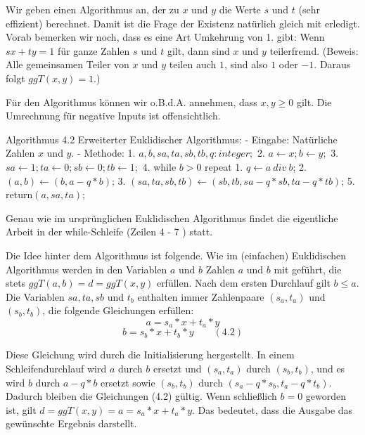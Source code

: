 \documentclass[a4paper]{article}
\begin{document}
\begin{multicols}{3}
        Wir geben einen Algorithmus an, der zu $x$ und $y$ die Werte $s$ und $t$ (sehr effizient) berechnet. Damit ist die Frage der Existenz natürlich gleich mit erledigt. Vorab bemerken wir noch, dass es eine Art Umkehrung von 1. gibt: Wenn $sx+ty= 1$ für ganze Zahlen $s$ und $t$ gilt, dann sind $x$ und $y$ teilerfremd. (Beweis: Alle gemeinsamen Teiler von $x$ und $y$ teilen auch $1$, sind also $1$ oder $-1$. Daraus folgt $ggT(x,y) = 1$.)

        Für den Algorithmus können wir o.B.d.A. annehmen, dass $x,y\geq 0$ gilt. Die Umrechnung für negative Inputs ist offensichtlich.

        Algorithmus 4.2 Erweiterter Euklidischer Algorithmus:
        - Eingabe: Natürliche Zahlen $x$ und $y$.
        - Methode:
        1. $a,b,sa,ta,sb,tb,q:integer;$
        2. $a\leftarrow x; b\leftarrow y;$
        3. $sa\leftarrow 1; ta\leftarrow 0; sb\leftarrow 0; tb\leftarrow 1;$
        4. while $b> 0$ repeat
        1. $q\leftarrow a\ div\ b$;
        2. $(a,b)\leftarrow (b,a-q*b)$;
        3. $(sa,ta,sb,tb)\leftarrow (sb,tb,sa-q*sb,ta-q*tb)$;
        5. return$(a,sa,ta)$;

        Genau wie im ursprünglichen Euklidischen Algorithmus findet die eigentliche Arbeit in der while-Schleife (Zeilen 4 - 7 ) statt.

        Die Idee hinter dem Algorithmus ist folgende. Wie im (einfachen) Euklidischen Algorithmus werden in den Variablen $a$ und $b$ Zahlen $a$ und $b$ mit geführt, die stets $ggT(a,b) =d= ggT(x,y)$ erfüllen. Nach dem ersten Durchlauf gilt $b\leq a$. Die Variablen $sa,ta,sb$ und $t_b$ enthalten immer Zahlenpaare $(s_a,t_a)$ und $(s_b,t_b)$, die folgende Gleichungen erfüllen:
        $$a=s_a*x+t_a*y$$
        $$b=s_b*x+t_b*y \quad\quad(4.2)$$

        Diese Gleichung wird durch die Initialisierung hergestellt. In einem Schleifendurchlauf wird $a$ durch $b$ ersetzt und $(s_a,t_a)$ durch $(s_b,t_b)$, und es wird $b$ durch $a-q*b$ ersetzt sowie $(s_b,t_b)$ durch $(s_a-q*s_b, t_a-q*t_b)$. Dadurch bleiben die Gleichungen (4.2) gültig. Wenn schließlich $b=0$ geworden ist, gilt $d=ggT(x,y) =a=s_a*x+t_a*y$. Das bedeutet, dass die Ausgabe das gewünschte Ergebnis darstellt.


\end{multicols}
\end{document}

